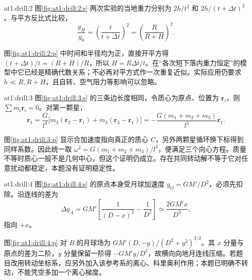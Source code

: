 \begin{drillsolution}{at1:drill:2}
图\ref{fig:at1:drill:2:s} 两次实验的当地重力分别为 $2h/t^2$ 和 $2h/(t+\Delta t)^2$。与平方反比式比较，
\[\frac{g_H}{g_0}=\left(\frac{t}{t+\Delta t}\right)^2
=\left(\frac{R}{R+H}\right)^2.
\]

图\ref{fig:at1:drill:2:p} 中时间和半径均为正，直接开平方得 $(t+\Delta t)/t=(R+H)/R$，所以 $H=R\Delta t/t$。在“各次短下落内重力恒定”的模型中它已经是精确代数关系；不必再对平方式作一次重复近似。实际应用仍要求 $h\ll R,R+H$，且自转、空气阻力等影响可以忽略。\end{drillsolution}
\begin{drillsolution}{at1:drill:3}
图\ref{fig:at1:drill:3:s} 的三条边长度相同，令质心为原点、位置为 $\bm r_i$，则 $\sum m_i\bm r_i=0$。对第一颗星，
\[\ddot{\bm r}_1=\frac G{l^3}\big[m_2(\bm r_2-\bm r_1)+m_3(\bm r_3-\bm r_1)\big]
=-\frac{G(m_1+m_2+m_3)}{l^3}\bm r_1.
\]

图\ref{fig:at1:drill:3:p} 显示合加速度指向真正的质心 $C$，另外两颗星循环换下标得到同样系数。因此统一取 $\omega^2=G(m_1+m_2+m_3)/l^3$，便满足三个向心方程。质量不等时质心一般不是几何中心，但这个证明仍成立。存在共同转动解不等于它对任意扰动都稳定，本题没有证明稳定性。\end{drillsolution}
\begin{drillsolution}{at1:drill:4}
图\ref{fig:at1:drill:4:s} 的原点本身受月球加速度 $g_O=GM'/D^2$，必须先扣除。沿连线的差为
\[\Delta g_A=GM'\left[\frac1{(D-x)^2}-\frac1{D^2}\right]
\simeq\frac{2GM'x}{D^3},\]
指向 $+x$。

图\ref{fig:at1:drill:4:p} 对 $B$ 的月球场为 $GM'(D,-y)/(D^2+y^2)^{3/2}$。其 $x$ 分量与原点的差为二阶，$y$ 分量保留一阶得 $-GM'y/D^3$，故横向向地月连线压缩。若题目改用转动坐标系，应另外加入该参考系的离心、科里奥利作用；本题已明确不转动，不能凭空多加一个离心梯度。\end{drillsolution}
